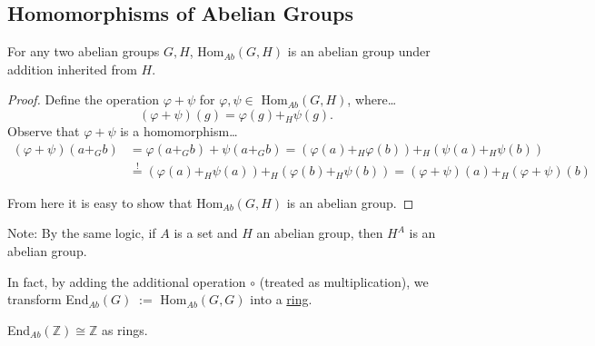 \subsection{Homomorphisms of Abelian Groups}\label{abeliangrouphomomorphism}

\begin{proposition}
\label{homabgroups}
For any two abelian groups $G,H$, Hom$_{Ab}(G,H)$ is an abelian group under addition inherited from $H$.
\end{proposition}

\begin{proof}
Define the operation $\varphi + \psi$ for $\varphi, \psi \in$ Hom$_{Ab}(G,H)$, where\dots
$$(\varphi + \psi)(g) = \varphi(g) +_H \psi(g).$$
Observe that $\varphi + \psi$ is a homomorphism\dots
\begin{align*}
	(\varphi + \psi)(a +_G b) &= \varphi(a +_G b) + \psi(a +_G b) = (\varphi(a) +_H \varphi(b)) +_H (\psi(a) +_H \psi(b))\\
							  &\overset{!}{=} (\varphi(a) +_H \psi(a)) +_H (\varphi(b) +_H \psi(b)) = (\varphi + \psi)(a) +_H (\varphi + \psi)(b)
\end{align*}

\noindent From here it is easy to show that Hom$_{Ab}(G,H)$ is an abelian group.
\end{proof}

\noindent Note: By the same logic, if $A$ is a set and $H$ an abelian group, then $H^A$ is an abelian group.\newline
 
\noindent In fact, by adding the additional operation $\circ$ (treated as multiplication), we transform End$_{Ab}(G) \; :=$ Hom$_{Ab}(G,G)$
into a \hyperref[ringdefinition]{ring}.

\begin{proposition}
End$_{Ab}(\mathbb{Z}) \cong \mathbb{Z}$ as rings.
\end{proposition}

